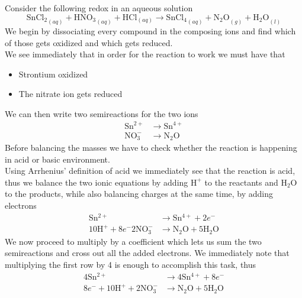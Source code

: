 \documentclass[../qm.tex]{subfiles}
\begin{document}
\begin{mtd}
	Consider the following redox in an aqueous solution
	\begin{equation}
		\mathrm{SnCl_2}_{(aq)}+\mathrm{HNO_3}_{(aq)}+\mathrm{HCl}_{(aq)}\to\mathrm{SnCl_4}_{(aq)}+\mathrm{N_2O}_{(g)}+\mathrm{H_2O}_{(l)}
		\label{eq:semiexp.chem}
	\end{equation}
	We begin by dissociating every compound in the composing ions and find which of those gets oxidized and which gets reduced.\\
	We see immediately that in order for the reaction to work we must have that 
	\begin{itemize}
	\item Strontium oxidized
	\item The nitrate ion gets reduced
	\end{itemize}
	We can then write two semireactions for the two ions
	\begin{equation*}
		\begin{aligned}
			\mathrm{Sn^{2+}}&\to\mathrm{Sn^{4+}}\\
			\mathrm{NO_3^-}&\to\mathrm{N_2O}
		\end{aligned}
	\end{equation*}
	Before balancing the masses we have to check whether the reaction is happening in acid or basic environment.\\
	Using Arrhenius' definition of acid we immediately see that the reaction is acid, thus we balance the two ionic equations by adding $\mathrm{H^+}$ to the reactants and $\mathrm{H_2O}$ to the products, while also balancing charges at the same time, by adding electrons
	\begin{equation*}
		\begin{aligned}
			\mathrm{Sn^{2+}}&\to\mathrm{Sn^{4+}}+2e^-\\
			10\mathrm{H^{+}}+8e^-\mathrm{2NO_3^-}&\to\mathrm{N_2O}+5\mathrm{H_2O}
		\end{aligned}
	\end{equation*}
	We now proceed to multiply by a coefficient which lets us sum the two semireactions and cross out all the added electrons. We immediately note that multiplying the first row by 4 is enough to accomplish this task, thus
	\begin{equation*}
		\begin{aligned}
			4\mathrm{Sn^{2+}}&\to4\mathrm{Sn^{4+}}+8e^-\\
			8e^-+10\mathrm{H^+}+2\mathrm{NO_3^-}&\to\mathrm{N_2O}+5\mathrm{H_2O}

\end{aligned}
\end{equation*}
\end{mtd}
\end{document}
